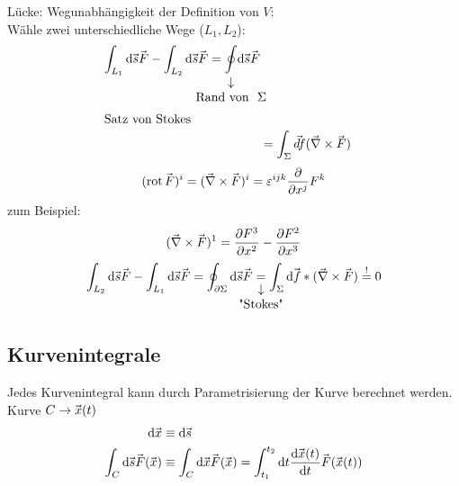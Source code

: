 \documentclass[a4paper]{scrartcl}
\DeclareMathOperator{\rot}{rot}
\renewcommand{\d}{\mathrm{d}}
\renewcommand{\v}[1]{\mathrlap{\vec{\mkern-2mu\phantom{#1}}}#1}
\theoremstyle{definition}
\theoremstyle{plain}
\theoremstyle{remark}
\theoremstyle{remark}
\begin{document}
Lücke: Wegunabhängigkeit der Definition von $V$: \\
         Wähle zwei unterschiedliche Wege ($L_1, L_2$):
\begin{align*}
\int_{L_1}\d\v s \v F - \int_{L_2}\d \v s \v F = \underarrow[\oint]{\text{Rand von } $\Sigma$} \d\v s\v F \\
\intertext{Satz von Stokes}
&= \int_{\Sigma}\v{d f}(\v\nabla \times\v F)
\end{align*}
\[(\rot \v F)^i = (\v\nabla \times \v F)^i = \varepsilon^{ijk}\frac{\partial}{\partial x^j} F^k\]
zum Beispiel:
\[(\v\nabla\times\v F)^1 = \frac{\partial F^3}{\partial x^2} - \frac{\partial F^2}{\partial x^3}\]
\[\int_{L_2}\d \v s \v F - \int_{L_1}\d \v s\v F = \oint_{\partial \Sigma} \d\v s \v F \underarrow[=]{\text{"Stokes"}} \int_{\Sigma}\d\v f*(\v\nabla\times\v F) \overset{!}{=} 0\]
\subsection{Kurvenintegrale}
\label{sec-4-4}
Jedes Kurvenintegral kann durch Parametrisierung der Kurve berechnet werden.
Kurve $C \to \v x(t)$
\begin{align*}
\d \v x &\equiv \d \v s \\
\int_C \d \v s \v F(\v x) &\equiv \int_C \d \v x \v F(\v x) = \int_{t_1}^{t_2} \d t \frac{\d \v x(t)}{\d t} \v F(\v x(t))
\end{align*}
\end{document}
